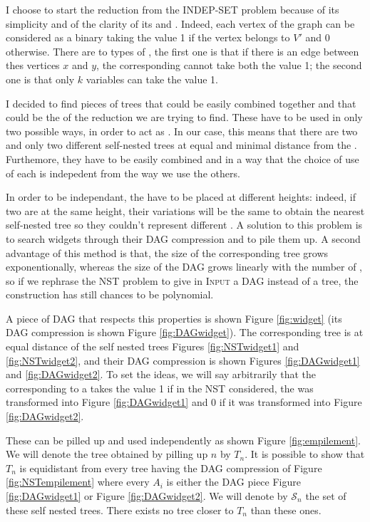 I choose to start the reduction from the INDEP-SET problem because
of its simplicity and of the clarity of its \constraints and
\variables. Indeed, each vertex of the graph can be considered as
a binary \variable taking the value 1 if the vertex belongs to $V'$
and 0 otherwise. There are to types of \constraints, the first one is that
if there is an edge between thes vertices $x$ and $y$, the
corresponding \variables cannot take both the value 1; the second one is
that only $k$ variables can take the value 1.

I decided to find pieces of trees that could be easily combined
together and that could be the \widgets of the reduction we are trying
to find. These \widgets have to be used in only two possible ways, in
order to act as \variables. In our case, this means that there are two
and only two different self-nested trees at equal and minimal distance
from the \widget. Furthemore, they have to be easily combined and in a
way that the choice of use of each \widget is indepedent from the way
we use the others.

In order to be independant, the \widgets have to be placed at
different heights: indeed, if two \widgets are at the same height,
their variations will be the same to obtain the nearest self-nested
tree so they couldn't represent different \variables. A solution to
this problem is to search widgets through their DAG compression and to
pile them up. A second advantage of this method is that, the size of
the corresponding tree grows exponentionally, whereas the size of the
DAG grows linearly with the number of \widgets, so if we rephrase the
NST problem to give in \textsc{Input} a DAG instead of a tree, the
construction has still chances to be polynomial.

A piece of DAG that respects this properties is shown Figure
\ref{fig:widget} (its DAG compression is shown Figure
\ref{fig:DAGwidget}). The corresponding tree is at equal distance of
the self nested trees Figures \ref{fig:NSTwidget1} and
\ref{fig:NSTwidget2}, and their DAG compression is shown Figures
\ref{fig:DAGwidget1} and \ref{fig:DAGwidget2}. To set the ideas, we
will say arbitrarily that the \variable corresponding to a \widget
takes the value 1 if in the NST considered, the \widget was
transformed into Figure \ref{fig:DAGwidget1} and 0 if it was
transformed into Figure \ref{fig:DAGwidget2}.

These \widgets can be pilled up and used independently as shown Figure
\ref{fig:empilement}. We will denote the tree obtained by pilling up
$n$ \widgets by $T_{n}$. It is possible to show that $T_{n}$ is
equidistant from every tree having the DAG compression of Figure
\ref{fig:NSTempilement} where every $A_{i}$ is either the DAG piece
Figure \ref{fig:DAGwidget1} or Figure \ref{fig:DAGwidget2}. We will
denote by $\mathcal{S}_{n}$ the set of these self nested trees. There
exists no tree closer to $T_{n}$ than these ones. %

